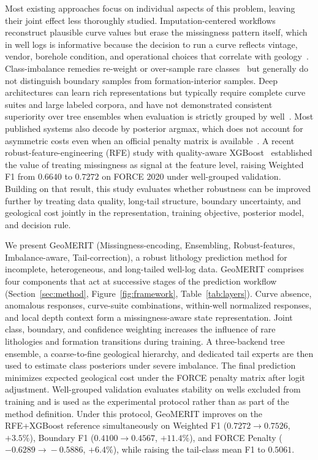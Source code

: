 \documentclass[bdcc,article,submit,pdftex,moreauthors]{Definitions/mdpi}
\begin{document}
Most existing approaches focus on individual aspects of this problem, leaving their joint
effect less thoroughly studied. Imputation-centered workflows~\cite{vanbuuren2011mice,stekhoven2012missforest,liu2025wellgan,xie2024cgan}
reconstruct plausible curve values but erase the missingness pattern itself, which in well
logs is informative because the decision to run a curve reflects vintage, vendor, borehole
condition, and operational choices that correlate with geology~\cite{chen2026rfe,little2019stats,josse2024missing}.
Class-imbalance remedies re-weight or over-sample rare
classes~\cite{chawla2002smote,lin2017focal,cui2019classbalanced,he2024imbalanced} but generally do not
distinguish boundary samples from formation-interior samples. Deep
architectures can learn rich representations but typically require complete curve suites and
large labeled corpora, and have not demonstrated consistent superiority over tree ensembles
when evaluation is strictly grouped by
well~\cite{wang2024dnnlitho,grinsztajn2022trees,shwartzziv2022tabular,mcelfresh2024benchmark}.
Most published systems also decode by posterior argmax, which does not account for
asymmetric costs even when an official penalty matrix is
available~\cite{elkan2001cost,berger1985decision}. A recent robust-feature-engineering (RFE)
study with quality-aware XGBoost~\cite{chen2026rfe} established the value of treating
missingness as signal at the feature level, raising Weighted F1 from $0.6640$ to $0.7272$ on
FORCE 2020 under well-grouped validation. Building on that result, this study evaluates
whether robustness can be improved further by treating data quality, long-tail structure,
boundary uncertainty, and geological cost jointly in the representation, training objective,
posterior model, and decision rule.

We present GeoMERIT (Missingness-encoding, Ensembling, Robust-features,
Imbalance-aware, Tail-correction), a robust lithology prediction method for incomplete,
heterogeneous, and long-tailed well-log data. GeoMERIT comprises four components that act at
successive stages of the prediction workflow
(Section~\ref{sec:method}, Figure~\ref{fig:framework}, Table~\ref{tab:layers}). Curve absence,
anomalous responses, curve-suite combinations, within-well normalized responses, and local
depth context form a missingness-aware state representation. Joint class, boundary, and
confidence weighting increases the influence of rare lithologies and formation transitions
during training. A three-backend tree ensemble, a coarse-to-fine geological hierarchy, and
dedicated tail experts are then used to estimate class posteriors under severe imbalance.
The final prediction minimizes expected geological cost under the FORCE penalty matrix after
logit adjustment. Well-grouped validation evaluates stability on wells excluded from training
and is used as the experimental protocol rather than as part of the method definition. Under
this protocol, GeoMERIT improves on the RFE+XGBoost reference
simultaneously on Weighted F1 ($0.7272\!\to\!0.7526$, $+3.5\%$), Boundary F1
($0.4100\!\to\!0.4567$, $+11.4\%$), and FORCE Penalty ($-0.6289\!\to\!-0.5886$, $+6.4\%$),
while raising the tail-class mean F1 to $0.5061$.
\end{document}

